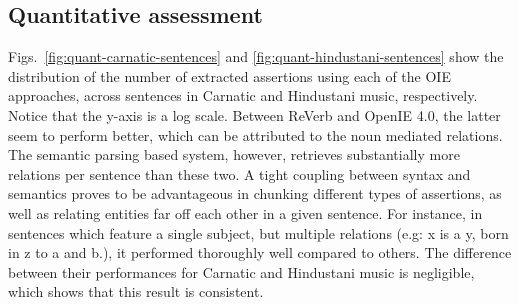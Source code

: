 \documentclass{llncs}
\begin{document}
\subsection{Quantitative assessment}
Figs.~\ref{fig:quant-carnatic-sentences} and \ref{fig:quant-hindustani-sentences} show the distribution of the number of extracted assertions using each of the OIE approaches, across sentences in Carnatic and Hindustani music, respectively. Notice that the y-axis is a log scale. Between ReVerb and OpenIE 4.0, the latter seem to perform better, which can be attributed to the noun mediated relations. The semantic parsing based system, however, retrieves substantially more relations per sentence than these two. A tight coupling between syntax and semantics proves to be advantageous in chunking different types of assertions, as well as relating entities far off each other in a given sentence. For instance, in sentences which feature a single subject, but multiple relations (e.g: x is a y, born in z to a and b.), it performed thoroughly well compared to others. The difference between their performances for Carnatic and Hindustani music is negligible, which shows that this result is consistent.
\end{document}
